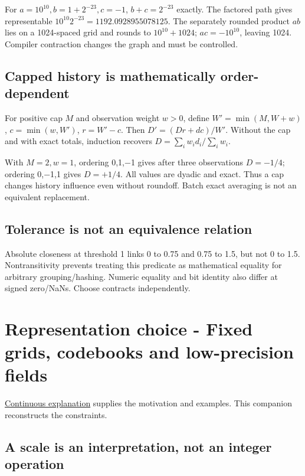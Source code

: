 For \(a=10^{10},b=1+2^{-23},c=-1\), \(b+c=2^{-23}\) exactly. The factored path gives representable \(10^{10}2^{-23}=1192.0928955078125\). The separately rounded product \(ab\) lies on a 1024-spaced grid and rounds to \(10^{10}+1024\); \(ac=-10^{10}\), leaving 1024. Compiler contraction changes the graph and must be controlled.

\subsection{Capped history is mathematically order-dependent}\label{01-foundations-i-ch011-capped-history-is-mathematically-order-dependent}

For positive cap \(M\) and observation weight \(w>0\), define \(W'=\min(M,W+w)\), \(c=\min(w,W')\), \(r=W'-c\). Then \(D'=(Dr+dc)/W'\). Without the cap and with exact totals, induction recovers \(D=\sum_iw_id_i/\sum_iw_i\).

With \(M=2,w=1\), ordering 0,1,−1 gives after three observations \(D=-1/4\); ordering 0,−1,1 gives \(D=+1/4\). All values are dyadic and exact. Thus a cap changes history influence even without roundoff. Batch exact averaging is not an equivalent replacement.

\subsection{Tolerance is not an equivalence relation}\label{01-foundations-i-ch011-tolerance-is-not-an-equivalence-relation}

Absolute closeness at threshold 1 links 0 to 0.75 and 0.75 to 1.5, but not 0 to 1.5. Nontransitivity prevents treating this predicate as mathematical equality for arbitrary grouping/hashing. Numeric equality and bit identity also differ at signed zero/NaNs. Choose contracts independently.

\section{Representation choice - Fixed grids, codebooks and low-precision fields}\label{01-foundations-i-ch011-representation-choice---fixed-grids-codebooks-and-low-precision-fields}

\hyperref[01-foundations-i-ch001-choosing-what-information-to-keep]{Continuous explanation} supplies the motivation and examples. This companion reconstructs the constraints.

\subsection{A scale is an interpretation, not an integer operation}\label{01-foundations-i-ch011-a-scale-is-an-interpretation-not-an-integer-operation}

